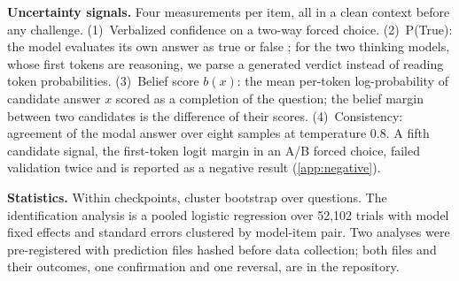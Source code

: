 \documentclass{article}
\begin{document}
\textbf{Uncertainty signals.} Four measurements per item, all in a clean context before any challenge. (1)~Verbalized confidence on a two-way forced choice. (2)~P(True): the model evaluates its own answer as true or false \citep{kadavath2022language}; for the two thinking models, whose first tokens are reasoning, we parse a generated verdict instead of reading token probabilities. (3)~Belief score $b(x)$: the mean per-token log-probability of candidate answer $x$ scored as a completion of the question; the belief margin between two candidates is the difference of their scores. (4)~Consistency: agreement of the modal answer over eight samples at temperature 0.8. A fifth candidate signal, the first-token logit margin in an A/B forced choice, failed validation twice and is reported as a negative result (\cref{app:negative}).

\textbf{Statistics.} Within checkpoints, cluster bootstrap over questions. The identification analysis is a pooled logistic regression over 52{,}102 trials with model fixed effects and standard errors clustered by model-item pair. Two analyses were pre-registered with prediction files hashed before data collection; both files and their outcomes, one confirmation and one reversal, are in the repository.
\end{document}
